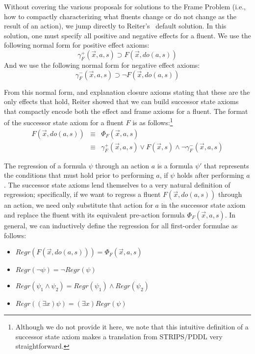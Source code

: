 \hskip -1pc
Without covering the various proposals for solutions to the Frame Problem (i.e., how to compactly
characterizing what fluents change or do not change as the result of an action), we jump directly
to Reiter's~\cite{reiter:frame} default solution.
In this solution, one must specify all positive and
negative effects for a fluent.  We use the following normal form for positive effect axioms:
\begin{displaymath} 
\gamma_F^+ (\vec{x},a,s) \supset F(\vec{x},do(a,s))
\end{displaymath}
And we use the following normal form for negative effect axioms:
\begin{displaymath}
\gamma_F^- (\vec{x},a,s) \supset \lnot F(\vec{x},do(a,s))
\end{displaymath}

From this normal form, and explanation closure axioms stating that
these are the only effects that hold, Reiter showed that we can build
successor state axioms that compactly encode both the effect and frame
axioms for a fluent.  The format of the successor state axiom for a
fluent $F$ is as follows:\footnote{Although we do not provide it here,
we note that this intuitive definition of a successor state axiom
makes a translation from STRIPS/PDDL very straightforward.}
\begin{eqnarray}
F(\vec{x},do(a,s)) & \equiv & \Phi_F(\vec{x},a,s) \nonumber \\
                   & \equiv & \gamma_F^+(\vec{x},a,s) \vee F(\vec{x},s) \wedge \lnot \gamma_F^-(\vec{x},a,s) \label{SSAeqn} 
\end{eqnarray}

The regression of a formula $\psi$ through an action $a$ is a formula
$\psi'$ that represents the conditions that must hold prior to performing
$a$, if $\psi$ holds after performing $a$.  The successor
state axioms lend themselves to a very natural definition of regression; 
specifically, if we want to regress a fluent $F(\vec{x},do(a,s))$ through 
an action, we need only
substitute that action for $a$ in the successor state axiom and replace
the fluent with its equivalent pre-action formula $\Phi_F(\vec{x},a,s)$.
In general, we can inductively define the regression
for all first-order formulae as follows:

\begin{itemize}
\item $Regr(F(\vec{x},do(a,s))) = \Phi_F(\vec{x},a,s)$
\item $Regr(\lnot \psi) = \lnot Regr(\psi)$
\item $Regr(\psi_1 \wedge \psi_2) = Regr(\psi_1) \wedge Regr(\psi_2)$
\item $Regr((\exists x) \psi) = (\exists x) Regr(\psi)$
\end{itemize}

